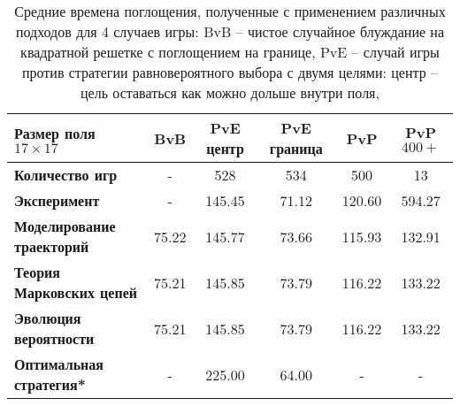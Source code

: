 \begin{table}[]
    \fontsize{10pt}{10pt}\selectfont
    \begin{tabular}{|l|c|c|c|c|c|}%
        
        \toprule
        Размер поля $17 \times 17$ & \textbf{BvB} & \textbf{PvE центр} & \textbf{PvE граница} & \textbf{PvP} & \textbf{PvP $400+$} \\ 
        \midrule
        \textbf{Количество игр} & -     & 528    & 534   & 500    & 13     \\ 
        \midrule
        \textbf{Эксперимент}  & -     & 145.45 & 71.12 & 120.60 & 594.27 \\ 
        \textbf{Моделирование траекторий}  & 75.22 & 145.77 & 73.66 & 115.93 & 132.91 \\
        \textbf{Теория Марковских цепей}  & 75.21 & 145.85 & 73.79 & 116.22 & 133.22 \\
        \textbf{Эволюция вероятности}   & 75.21 & 145.85 & 73.79 & 116.22 & 133.22 \\ 
        \textbf{Оптимальная стратегия*}     & -     & 225.00 & 64.00 & -    & -      \\ 
        \bottomrule
    \end{tabular}
    \caption{
        Средние времена поглощения, полученные с применением различных подходов для 4 случаев игры: 
        BvB -- чистое случайное блуждание на квадратной решетке с поглощением на границе,
        PvE -- случай игры против стратегии равновероятного выбора с двумя целями: центр -- цель оставаться как можно дольше внутри поля, 
}
\end{table}
